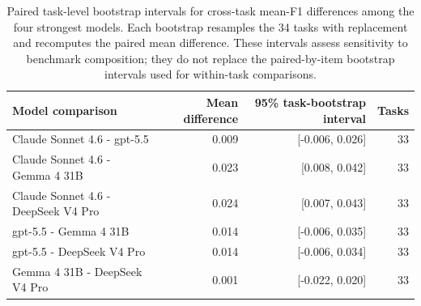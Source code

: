 \begin{table}[H]
\centering
\caption{Paired task-level bootstrap intervals for cross-task mean-F1 differences among the four strongest models. Each bootstrap resamples the 34 tasks with replacement and recomputes the paired mean difference. These intervals assess sensitivity to benchmark composition; they do not replace the paired-by-item bootstrap intervals used for within-task comparisons. \label{tab:task-bootstrap}}
\centering
\fontsize{9}{11}\selectfont
\begin{tabular}[t]{lrrr}
\toprule
Model comparison & Mean difference & 95\% task-bootstrap interval & Tasks\\
\midrule
Claude Sonnet 4.6 - gpt-5.5 & 0.009 & {}[-0.006, 0.026] & 33\\
Claude Sonnet 4.6 - Gemma 4 31B & 0.023 & {}[0.008, 0.042] & 33\\
Claude Sonnet 4.6 - DeepSeek V4 Pro & 0.024 & {}[0.007, 0.043] & 33\\
gpt-5.5 - Gemma 4 31B & 0.014 & {}[-0.006, 0.035] & 33\\
gpt-5.5 - DeepSeek V4 Pro & 0.014 & {}[-0.006, 0.034] & 33\\
\addlinespace
Gemma 4 31B - DeepSeek V4 Pro & 0.001 & {}[-0.022, 0.020] & 33\\
\bottomrule
\end{tabular}
\end{table}
